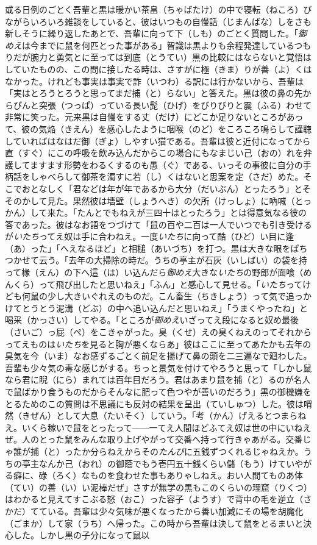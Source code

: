 \documentclass{book}
\begin{document}
或る日例のごとく吾輩と黒は暖かい茶畠（ちゃばたけ）の中で寝転（ねころ）びながらいろいろ雑談をしていると、彼はいつもの自慢話（じまんばな）しをさも新しそうに繰り返したあとで、吾輩に向って下（しも）のごとく質問した。「\emph{御めえ}は今までに鼠を何匹とった事がある」智識は黒よりも余程発達しているつもりだが腕力と勇気とに至っては到底（とうてい）黒の比較にはならないと覚悟はしていたものの、この問に接したる時は、さすがに極（きま）りが善（よ）くはなかった。けれども事実は事実で詐（いつわ）る訳には行かないから、吾輩は「実はとろうとろうと思ってまだ捕（と）らない」と答えた。黒は彼の鼻の先からぴんと突張（つっぱ）っている長い髭（ひげ）をびりびりと震（ふる）わせて非常に笑った。元来黒は自慢をする丈（だけ）にどこか足りないところがあって、彼の気焔（きえん）を感心したように咽喉（のど）をころころ鳴らして謹聴していればはなはだ御（ぎょ）しやすい猫である。吾輩は彼と近付になってから直（すぐ）にこの呼吸を飲み込んだからこの場合にもなまじい己（おの）れを弁護してますます形勢をわるくするのも愚（ぐ）である、いっその事彼に自分の手柄話をしゃべらして御茶を濁すに若（し）くはないと思案を定（さだ）めた。そこでおとなしく「君などは年が年であるから大分（だいぶん）とったろう」とそそのかして見た。果然彼は墻壁（しょうへき）の欠所（けっしょ）に吶喊（とっかん）して来た。「たんとでもねえが三四十はとったろう」とは得意気なる彼の答であった。彼はなお語をつづけて「鼠の百や二百は一人でいつでも引き受けるが\emph{いたち}ってえ奴は手に合わねえ。一度\emph{いたち}に向って酷（ひど）い目に逢（あ）った」「へえなるほど」と相槌（あいづち）を打つ。黒は大きな眼をぱちつかせて云う。「去年の大掃除の時だ。うちの亭主が石灰（いしばい）の袋を持って椽（えん）の下へ這（は）い込んだら\emph{御めえ}大きな\emph{いたち}の野郎が面喰（めんくら）って飛び出したと思いねえ」「ふん」と感心して見せる。「\emph{いたち}ってけども何鼠の少し大きいぐれえのものだ。こん畜生（ちきしょう）って気で追っかけてとうとう泥溝（どぶ）の中へ追い込んだと思いねえ」「うまくやったね」と喝采（かっさい）してやる。「ところが\emph{御めえ}いざってえ段になると奴め最後（さいご）っ屁（ぺ）をこきゃがった。臭（くせ）えの臭くねえのってそれからってえものは\emph{いたち}を見ると胸が悪くならあ」彼はここに至ってあたかも去年の臭気を今（いま）なお感ずるごとく前足を揚げて鼻の頭を二三遍なで廻わした。吾輩も少々気の毒な感じがする。ちっと景気を付けてやろうと思って「しかし鼠なら君に睨（にら）まれては百年目だろう。君はあまり鼠を捕（と）るのが名人で鼠ばかり食うものだからそんなに肥って色つやが善いのだろう」黒の御機嫌をとるためのこの質問は不思議にも反対の結果を呈出（ていしゅつ）した。彼は喟然（きぜん）として大息（たいそく）していう。「考（かん）げえるとつまらねえ。いくら稼いで鼠をとったって――一てえ人間ほどふてえ奴は世の中にいねえぜ。人のとった鼠をみんな取り上げやがって交番へ持って行きゃあがる。交番じゃ誰が捕（と）ったか分らねえからその\emph{たんび}に五銭ずつくれるじゃねえか。うちの亭主なんか己（おれ）の御蔭でもう壱円五十銭くらい儲（もう）けていやがる癖に、碌（ろく）なものを食わせた事もありゃしねえ。おい人間てものあ体（てい）の善（い）い泥棒だぜ」さすが無学の黒もこのくらいの理窟（りくつ）はわかると見えてすこぶる怒（おこ）った容子（ようす）で背中の毛を逆立（さかだ）てている。吾輩は少々気味が悪くなったから善い加減にその場を胡魔化（ごまか）して家（うち）へ帰った。この時から吾輩は決して鼠をとるまいと決心した。しかし黒の子分になって鼠以
\end{document}
